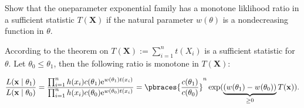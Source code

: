 
\begin{exercise}

Show that the oneparameter exponential family has a monotone liklihood ratio in a sufficient statistic $T(\mathbf X)$ if the natural parameter $w(\theta)$ is a nondecreasing function in $\theta$.

\end{exercise}


\begin{solution}

According to the theorem on \cite[lecure 8, slide 48]{EStat} $T(\mathbf X) := \sum_{i=1}^n t(X_i)$ is a sufficient statistic for $\theta$.
Let $\theta_0 \leq \theta_1$, then the following ratio is monotone in $T(\mathbf X)$:

\begin{align*}
    \frac
    {
        L(\mathbf x \mid \theta_1)
    }{
        L(\mathbf x \mid \theta_0)
    }
    =
    \frac
    {
        \prod_{i=1}^n
            h(x_i)
            c(\theta_1)
            \mathrm e^{w(\theta_1) t(x_i)}
    }{
        \prod_{i=1}^n
        h(x_i)
        c(\theta_0)
        \mathrm e^{w(\theta_0) t(x_i)}
    }
    =
    \pbraces
    {
        \frac{c(\theta_1)}{c(\theta_0)}
    }^n
    \exp
    (
        \underbrace
        {
            (w(\theta_1) - w(\theta_0))
        }_{
            \geq 0
        }
        T(\mathbf x)
    ).
\end{align*}

\end{solution}

